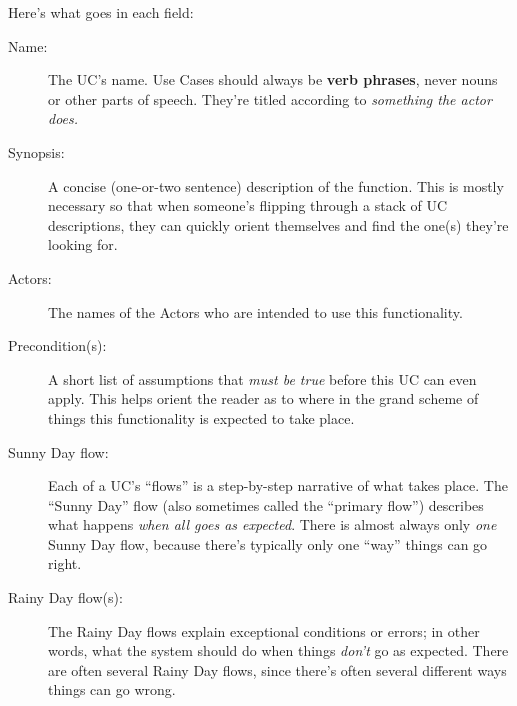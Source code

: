 \begin{center}
\end{center}

Here's what goes in each field:
\vspace{-.1in}

\begin{description}
\item[Name:] The UC's name. Use Cases should always be \textbf{verb phrases},
never nouns or other parts of speech. They're titled according to
\textit{something the actor does.}
\item[Synopsis:] A concise (one-or-two sentence) description of the function.
This is mostly necessary so that when someone's flipping through a stack of UC
descriptions, they can quickly orient themselves and find the one(s) they're
looking for.
\item[Actors:] The names of the Actors who are intended to use this
functionality.
\item[Precondition(s):] A short list of assumptions that \textit{must be true}
before this UC can even apply. This helps orient the reader as to where in the
grand scheme of things this functionality is expected to take place.
\item[Sunny Day flow:] Each of a UC's ``flows'' is a step-by-step narrative of
what takes place. The ``Sunny Day'' flow (also sometimes called the ``primary
flow'') describes what happens \textit{when all goes as expected}. There is
almost always only \textit{one} Sunny Day flow, because there's typically only
one ``way'' things can go right.
\item[Rainy Day flow(s):] The Rainy Day flows explain exceptional conditions
or errors; in other words, what the system should do when things
\textit{don't} go as expected. There are often several Rainy Day flows, since
there's often several different ways things can go wrong.
\end{description}

